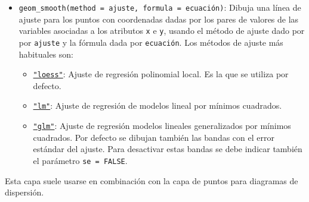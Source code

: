 \documentclass[
  a4paper,
]{scrreport}
\providecommand{\tightlist}{%
  \setlength{\itemsep}{0pt}\setlength{\parskip}{0pt}}\usepackage{longtable,booktabs,array}
\theoremstyle{definition}
\theoremstyle{definition}
\theoremstyle{remark}
\begin{document}
\begin{itemize}
\tightlist
\item
  \texttt{geom\_smooth(method\ =\ ajuste,\ formula\ =\ ecuación)}:
  Dibuja una línea de ajuste para los puntos con coordenadas dadas por
  los pares de valores de las variables asociadas a los atributos
  \texttt{x} e \texttt{y}, usando el método de ajuste dado por por
  \texttt{ajuste} y la fórmula dada por \texttt{ecuación}. Los métodos
  de ajuste más habituales son:

  \begin{itemize}
  \tightlist
  \item
    \href{https://rdrr.io/r/stats/loess.html}{\texttt{"loess"}}: Ajuste
    de regresión polinomial local. Es la que se utiliza por defecto.
  \item
    \href{https://rdrr.io/r/stats/lm.html}{\texttt{"lm"}}: Ajuste de
    regresión de modelos lineal por mínimos cuadrados.
  \item
    \href{https://rdrr.io/r/stats/glm.html}{\texttt{"glm"}}: Ajuste de
    regresión modelos lineales generalizados por mínimos cuadrados. Por
    defecto se dibujan también las bandas con el error estándar del
    ajuste. Para desactivar estas bandas se debe indicar también el
    parámetro \texttt{se\ =\ FALSE}.
  \end{itemize}
\end{itemize}

Esta capa suele usarse en combinación con la capa de puntos para
diagramas de dispersión.
\end{document}
